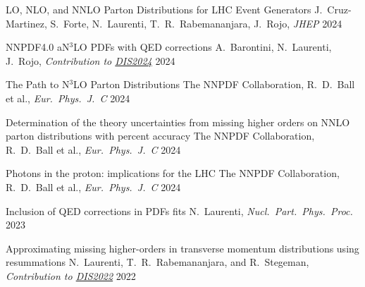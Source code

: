 
\begin{cvhonors}


    \cvhonor
    {LO, NLO, and NNLO Parton Distributions for LHC Event Generators} %
    {J.~Cruz-Martinez, S.~Forte, N.~Laurenti, T.~R.~Rabemananjara, J.~Rojo, \emph{JHEP}} %
    {\vspace{0.35cm}\href{https://inspirehep.net/literature/2800507}{}}
    {\vspace{0.35cm}2024}

    \cvhonor
    {NNPDF4.0 aN$^3$LO PDFs with QED corrections} %
    {A.~Barontini, N.~Laurenti, J.~Rojo, \emph{Contribution to \href{https://inspirehep.net/conferences/2667502?ui-citation-summary=true}{DIS2024}}} %
    {\href{https://inspirehep.net/literature/2794583}{}}
    {2024}
    
    \cvhonor
    {The Path to N$^3$LO Parton Distributions} %
    {The NNPDF Collaboration, R.~D.~Ball et al., \emph{Eur.\ Phys.\ J.\ C}} %
    {\href{https://inspirehep.net/literature/2762925}{}}
    {2024}
    
    \cvhonor
    {Determination of the theory uncertainties from missing higher orders on NNLO parton distributions with percent accuracy} %
    {The NNPDF Collaboration, R.~D.~Ball et al., \emph{Eur.\ Phys.\ J.\ C}} %
    {\vspace{0.35cm}\href{https://inspirehep.net/literature/2749502}{}}
    {\vspace{0.35cm}2024}
    
    \cvhonor
    {Photons in the proton: implications for the LHC} %
    {The NNPDF Collaboration, R.~D.~Ball et al., \emph{Eur.\ Phys.\ J.\ C}} %
    {\href{https://inspirehep.net/literature/2747770}{}}
    {2024}

    \cvhonor
    {Inclusion of QED corrections in PDFs ﬁts}
    {N.~Laurenti, \textit{Nucl.\ Part.\ Phys.\ Proc.}}
    {\href{https://doi.org/10.1016/j.nuclphysbps.2023.11.013}{}}
    {2023}
    
    \cvhonor
    {Approximating missing higher-orders in transverse momentum distributions using resummations}
    {N.~Laurenti, T.~R.~Rabemananjara, and R.~Stegeman, \emph{Contribution to \href{https://inspirehep.net/conferences/1914506?ui-citation-summary=true}{DIS2022}}}
    {\vspace{0.35cm}\href{https://inspirehep.net/literature/2122473}{}}
    {\vspace{0.35cm}2022}

\end{cvhonors}